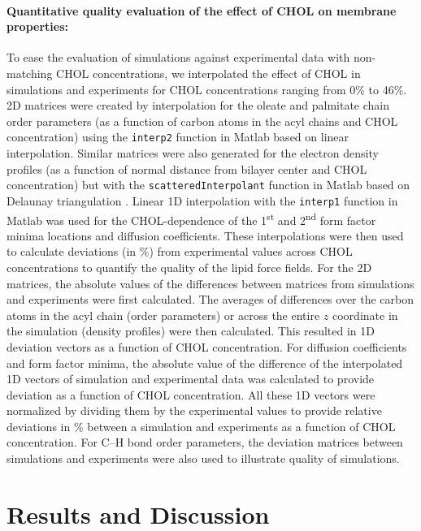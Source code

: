 \documentclass[journal=jctcce]{achemso}
\begin{document}
\paragraph{Quantitative quality evaluation of the effect of CHOL on membrane properties:} To ease the evaluation of simulations against experimental data with non-matching CHOL concentrations, we interpolated the effect of CHOL in simulations and experiments for CHOL concentrations ranging from 0\% to 46\%. 2D matrices were created by interpolation for the oleate and palmitate chain order parameters (as a function of carbon atoms in the acyl chains and CHOL concentration) using the \texttt{interp2} function in Matlab based on linear interpolation. Similar matrices were also generated for the electron density profiles (as a function of normal distance from bilayer center and CHOL concentration) but with the \texttt{scatteredInterpolant} function in Matlab based on Delaunay triangulation \cite{amidror2002scattered}. Linear 1D interpolation with the \texttt{interp1} function in Matlab was used for the CHOL-dependence of the 1\textsuperscript{st} and 2\textsuperscript{nd} form factor minima locations and diffusion coefficients. These interpolations were then used to calculate deviations (in \%) from experimental values across CHOL concentrations to quantify the quality of the lipid force fields.  For the 2D matrices, the absolute values of the differences between matrices from simulations and experiments were first calculated. The averages of differences over the carbon atoms in the acyl chain (order parameters) or across the entire $z$ coordinate in the simulation (density profiles) were then calculated. This resulted in 1D deviation vectors as a function of CHOL concentration. For diffusion coefficients and form factor minima, the absolute value of the difference of the interpolated 1D vectors of simulation and experimental data was calculated to provide deviation as a function of CHOL concentration. All these 1D vectors were normalized by dividing them by the experimental values to provide relative deviations in \% between a simulation and experiments as a function of CHOL concentration. For C--H bond order parameters, the deviation matrices between simulations and experiments were also used to illustrate quality of simulations.


\section{Results and Discussion}
\end{document}
